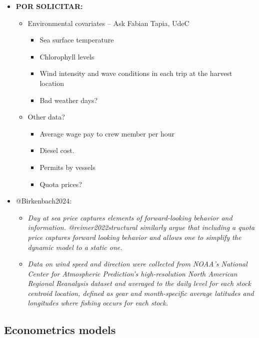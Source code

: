 \begin{itemize}
\tightlist
\item
  \textbf{POR SOLICITAR:}

  \begin{itemize}
  \tightlist
  \item
    Environmental covariates -- Ask Fabian Tapia, UdeC

    \begin{itemize}
    \tightlist
    \item
      Sea surface temperature
    \item
      Chlorophyll levels
    \item
      Wind intensity and wave conditions in each trip at the harvest
      location
    \item
      Bad weather days?
    \end{itemize}
  \item
    Other data?

    \begin{itemize}
    \tightlist
    \item
      Average wage pay to crew member per hour
    \item
      Diesel cost.
    \item
      Permits by vessels
    \item
      Quota prices?
    \end{itemize}
  \end{itemize}
\item
  @Birkenbach2024:

  \begin{itemize}
  \tightlist
  \item
    \emph{Day at sea price captures elements of forward-looking behavior
    and information. @reimer2022structural similarly argue that
    including a quota price captures forward looking behavior and allows
    one to simplify the dynamic model to a static one.}
  \item
    \emph{Data on wind speed and direction were collected from NOAA's
    National Center for Atmospheric Prediction's high-resolution North
    American Regional Reanalysis dataset and averaged to the daily level
    for each stock centroid location, defined as gear and month-specific
    average latitudes and longitudes where fishing occurs for each
    stock.}
  \end{itemize}
\end{itemize}

\hypertarget{econometrics-models}{%
\subsection{Econometrics models}\label{econometrics-models}}

